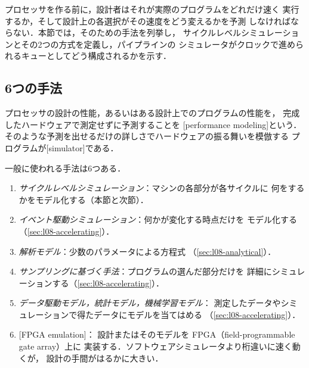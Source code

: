 \documentclass[../main.tex]{subfiles}
\begin{document}
プロセッサを作る前に，設計者はそれが実際のプログラムをどれだけ速く
実行するか，そして設計上の各選択がその速度をどう変えるかを予測
しなければならない．本節では，そのための手法を列挙し，
サイクルレベルシミュレーションとその2つの方式を定義し，パイプラインの
シミュレータがクロックで進められるキューとしてどう構成されるかを示す．

\subsection{6つの手法}

\begin{definition}[性能モデリング]
  \label{def:l08-performance-modeling}
  プロセッサの設計の性能，あるいはある設計上でのプログラムの性能を，
  完成したハードウェアで測定せずに予測することを
  [performance modeling]という．
  そのような予測を出せるだけの詳しさでハードウェアの振る舞いを模倣する
  プログラムが[simulator]である．
\end{definition}

一般に使われる手法は6つある．
\begin{enumerate}
  \item \emph{サイクルレベルシミュレーション}：マシンの各部分が各サイクルに
    何をするかをモデル化する（本節と次節）．
  \item \emph{イベント駆動シミュレーション}：何かが変化する時点だけを
    モデル化する（\cref{sec:l08-accelerating}）．
  \item \emph{解析モデル}：少数のパラメータによる方程式
    （\cref{sec:l08-analytical}）．
  \item \emph{サンプリングに基づく手法}：プログラムの選んだ部分だけを
    詳細にシミュレーションする（\cref{sec:l08-accelerating}）．
  \item \emph{データ駆動モデル，統計モデル，機械学習モデル}：
    測定したデータやシミュレーションで得たデータにモデルを当てはめる
    （\cref{sec:l08-accelerating}）．
  \item
    [FPGA emulation]：
    設計またはそのモデルを FPGA（field-programmable gate array）上に
    実装する．ソフトウェアシミュレータより桁違いに速く動くが，
    設計の手間がはるかに大きい．
\end{enumerate}
\end{document}
